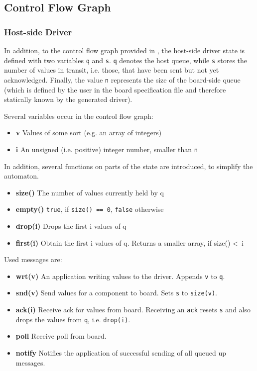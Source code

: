 \documentclass{report}
\begin{document}
\newpage
\subsection{Control Flow Graph}

\subsubsection{Host-side Driver}
In addition, to the control flow graph provided in , the host-side driver state is defined with two variables \texttt{q} and \texttt{s}. \texttt{q} denotes the host queue, while \texttt{s} stores the number of values in transit, i.e. those, that have been sent but not yet acknowledged. Finally, the value \texttt{n} represents the size of the board-side queue (which is defined by the user in the board specification file and therefore statically known by the generated driver).

Several variables occur in the control flow graph:
\begin{itemize} \itemsep1pt \parskip0pt 
\item \textbf{v} Values of some sort (e.g. an array of integers)
\item \textbf{i} An unsigned (i.e. positive) integer number, smaller than \texttt{n}
\end{itemize}

In addition, several functions on parts of the state are introduced, to simplify the automaton.
\begin{itemize} \itemsep1pt \parskip0pt 
\item \textbf{size()} The number of values currently held by q
\item \textbf{empty()} \texttt{true}, if \texttt{size() == 0}, \texttt{false} otherwise
\item \textbf{drop(i)} Drops the first i values of q
\item \textbf{first(i)} Obtain the first i values of q. Returns a smaller array, if size() \textless ~i
\end{itemize}

Used messages are:
\begin{itemize} \itemsep1pt \parskip0pt 
\item \textbf{wrt(v)} An application writing values to the driver. Appends \texttt{v} to \texttt{q}.
\item \textbf{snd(v)} Send values for a component to board. Sets \texttt{s} to \texttt{size(v)}.
\item \textbf{ack(i)} Receive ack for values from board. Receiving an \texttt{ack} resets \texttt{s} and also drops the values from \texttt{q}, i.e. \texttt{drop(i)}.
\item \textbf{poll} Receive poll from board.
\item \textbf{notify} Notifies the application of successful sending of all queued up messages.
\end{itemize}
\end{document}
